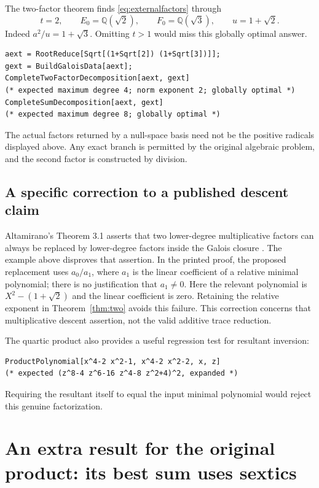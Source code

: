 \documentclass[11pt,a4paper]{article}
\theoremstyle{definition}\newtheorem{definition}[theorem]{Definition}
\theoremstyle{remark}\newtheorem{remark}[theorem]{Remark}
\newcommand{\Q}{\mathbb Q}
\begin{document}
The two-factor theorem finds \eqref{eq:externalfactors} through
\[
 t=2,\qquad E_0=\Q(\sqrt2),\qquad F_0=\Q(\sqrt3),\qquad u=1+\sqrt2.
\]
Indeed $a^2/u=1+\sqrt3$. Omitting $t>1$ would miss this globally optimal
answer.

\begin{lstlisting}
aext = RootReduce[Sqrt[(1+Sqrt[2]) (1+Sqrt[3])]];
gext = BuildGaloisData[aext];
CompleteTwoFactorDecomposition[aext, gext]
(* expected maximum degree 4; norm exponent 2; globally optimal *)
CompleteSumDecomposition[aext, gext]
(* expected maximum degree 8; globally optimal *)
\end{lstlisting}
The actual factors returned by a null-space basis need not be the positive
radicals displayed above. Any exact branch is permitted by the original
algebraic problem, and the second factor is constructed by division.

\subsection{A specific correction to a published descent claim}

Altamirano's Theorem 3.1 asserts that two lower-degree multiplicative factors
can always be replaced by lower-degree factors inside the Galois closure
\cite[Theorem 3.1, p.~5]{altamirano}. The example above disproves that
assertion. In the printed proof, the proposed replacement uses $a_0/a_1$,
where $a_1$ is the linear coefficient of a relative minimal polynomial;
there is no justification that $a_1\ne0$. Here the relevant polynomial is
$X^2-(1+\sqrt2)$ and the linear coefficient is zero. Retaining the
relative exponent in Theorem~\ref{thm:two} avoids this failure. This
correction concerns that multiplicative descent assertion, not the valid
additive trace reduction.

The quartic product also provides a useful regression test for resultant
inversion:
\begin{lstlisting}
ProductPolynomial[x^4-2 x^2-1, x^4-2 x^2-2, x, z]
(* expected (z^8-4 z^6-16 z^4-8 z^2+4)^2, expanded *)
\end{lstlisting}
Requiring the resultant itself to equal the input minimal polynomial would
reject this genuine factorization.

\section{An extra result for the original product: its best sum uses sextics}
\label{sec:sextics}
\end{document}
